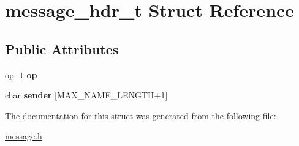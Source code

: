\hypertarget{structmessage__hdr__t}{}\section{message\+\_\+hdr\+\_\+t Struct Reference}
\label{structmessage__hdr__t}
\subsection*{Public Attributes}
\begin{DoxyCompactItemize}
\item 
\mbox{\label{structmessage__hdr__t_ab7f4eacc8e900cca79b63ddfb02d67fd}} 
\hyperlink{ops_8h_ac6fa1b34da8872e34c2936391332f44c}{op\+\_\+t} {\bfseries op}
\item 
\mbox{\label{structmessage__hdr__t_a53c6bc32851e00a0fe818315d5029f43}} 
char {\bfseries sender} \mbox{[}M\+A\+X\+\_\+\+N\+A\+M\+E\+\_\+\+L\+E\+N\+G\+TH+1\mbox{]}
\end{DoxyCompactItemize}


The documentation for this struct was generated from the following file\+:\begin{DoxyCompactItemize}
\item 
\hyperlink{message_8h}{message.\+h}\end{DoxyCompactItemize}
